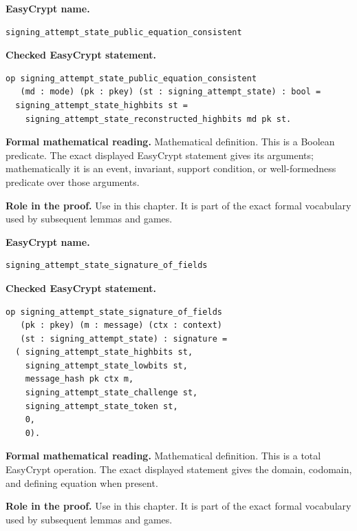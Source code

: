 \begin{formaldefinition}
\noindent\textbf{EasyCrypt name.}
\begin{lstlisting}[language=EasyCrypt,basicstyle=\ttfamily\scriptsize]
signing_attempt_state_public_equation_consistent
\end{lstlisting}
\noindent\textbf{Checked EasyCrypt statement.}
\begin{lstlisting}[language=EasyCrypt,basicstyle=\ttfamily\scriptsize]
op signing_attempt_state_public_equation_consistent
   (md : mode) (pk : pkey) (st : signing_attempt_state) : bool =
  signing_attempt_state_highbits st =
    signing_attempt_state_reconstructed_highbits md pk st.
\end{lstlisting}
\noindent\textbf{Formal mathematical reading.}
Mathematical definition. This is a Boolean predicate.  The exact displayed EasyCrypt statement gives its arguments; mathematically it is an event, invariant, support condition, or well-formedness predicate over those arguments.

\noindent\textbf{Role in the proof.}
Use in this chapter. It is part of the exact formal vocabulary used by subsequent lemmas and games.

\end{formaldefinition}

\begin{formaldefinition}
\noindent\textbf{EasyCrypt name.}
\begin{lstlisting}[language=EasyCrypt,basicstyle=\ttfamily\scriptsize]
signing_attempt_state_signature_of_fields
\end{lstlisting}
\noindent\textbf{Checked EasyCrypt statement.}
\begin{lstlisting}[language=EasyCrypt,basicstyle=\ttfamily\scriptsize]
op signing_attempt_state_signature_of_fields
   (pk : pkey) (m : message) (ctx : context)
   (st : signing_attempt_state) : signature =
  ( signing_attempt_state_highbits st,
    signing_attempt_state_lowbits st,
    message_hash pk ctx m,
    signing_attempt_state_challenge st,
    signing_attempt_state_token st,
    0,
    0).
\end{lstlisting}
\noindent\textbf{Formal mathematical reading.}
Mathematical definition. This is a total EasyCrypt operation.  The exact displayed statement gives the domain, codomain, and defining equation when present.

\noindent\textbf{Role in the proof.}
Use in this chapter. It is part of the exact formal vocabulary used by subsequent lemmas and games.

\end{formaldefinition}

